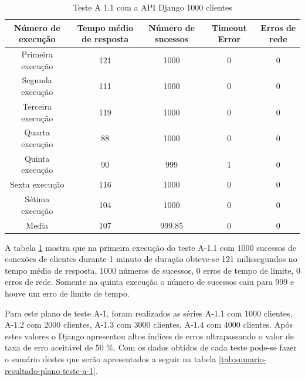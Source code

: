   \begin{table}[H]
    \centering
    \footnotesize
    \setlength{\abovecaptionskip}{0pt}
    \setlength{\belowcaptionskip}{0pt}
    \caption[Teste A-1.1 com a API Django 1000 clientes]{Teste A 1.1 com a API Django 1000 clientes}
    \label{tab:teste-a-1-1}
    \begin{tabular}{c|c|c|c|c}
      \hline \hline
      Número de execução &	Tempo médio de resposta &	Número de sucessos &	Timeout Error &		 Erros de rede \\
      \hline \hline
      Primeira execução &		121 &				1000 &			0 &			0 \\
      Segunda execução &		111 &				1000 &			0 &			0 \\
      Terceira execução &		119 &				1000 &			0 &			0 \\
      Quarta execução  &		88 &				1000 &			0 &			0 \\
      Quinta execução  &		90 &				999 &			1 &			0 \\
      Sexta execução   &		116 &				1000 &			0 &			0 \\
      Sétima execução  &		104 &				1000 &			0 &			0 \\
      Media & 				107 &				999.85 & 		0 &			0 \\
      \hline \hline
    \end{tabular}
  \end{table}  
  
  A tabela \ref{tab:teste-a-1-1} mostra que na primeira execução do teste A-1.1 com 1000 sucessos de conexões de clientes
  durante 1 minuto de duração obteve-se 121 milissegundos no tempo médio de resposta,
  1000 números de sucessos, 0 erros de tempo de limite, 0 erros de rede. Somente na quinta execução o número de sucessos
  caiu para 999 e houve um erro de limite de tempo.
  
  Para este plano de teste A-1, foram realizados as séries A-1.1 com 1000 clientes, A-1.2 com 2000 clientes, A-1.3 com 3000 clientes,
  A-1.4 com 4000 clientes. Após estes valores o Django apresentou altos índices de erros ultrapassando o valor de taxa de erro
  aceitável de 50 \%. Com os dados obtidos de cada teste pode-se fazer o sumário
  destes que serão apresentados a seguir na tabela \ref{tab:sumario-resultado-plano-teste-a-1}.
  
